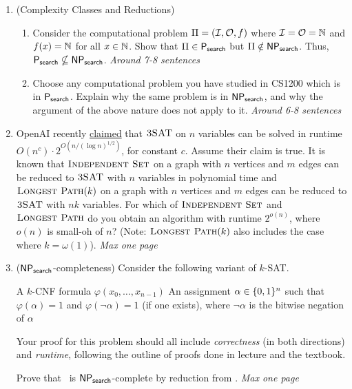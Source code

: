 \documentclass[11pt]{article}
\begin{document}
\begin{enumerate}
    \item (Complexity Classes and Reductions)
    \begin{enumerate}
        \item 
        Consider the computational problem $\Pi = (\mathcal{I},\mathcal{O},f)$ where $\mathcal{I}=\mathcal{O}=\mathbb{N}$ and $f(x)=\mathbb{N}$ for all $x\in \mathbb{N}$.  Show that $\Pi\in \mathsf{P_{search}}$ but $\Pi\notin \mathsf{NP_{search}}$.  Thus, $\mathsf{P_{search}}\nsubseteq\mathsf{NP_{search}}$. \textit{Around 7-8 sentences}

\item  Choose any computational problem you have studied in CS1200 which is in $\mathsf{P_{search}}$. Explain why the same problem is in $\mathsf{NP_{search}}$, and why the argument of the above nature does not apply to it. \textit{Around 6-8 sentences}

\end{enumerate}

\item OpenAI recently \href{https://openai.com/index/building-scientific-understanding-with-academic-communities/}{claimed} that $\text{\sc 3SAT}$ on $n$ variables can be solved in runtime $O(n^c) \cdot 2^{O(n/(\log n)^{1/2})}$, for constant $c$. Assume their claim is true. It is known that $\text{\sc Independent Set}$ on a graph with $n$ vertices and $m$ edges can be reduced to $\text{\sc 3SAT}$ with $n$ variables in polynomial time and $\text{\sc Longest Path}(k)$ on a graph with $n$ vertices and $m$ edges can be reduced to $\text{\sc 3SAT}$ with $nk$ variables. For which of $\text{\sc Independent Set}$ and $\text{\sc Longest Path}$ do you obtain an algorithm with runtime $2^{o(n)}$, where $o(n)$ is small-oh of $n$? (Note: $\text{\sc Longest Path}(k)$ also includes the case where $k=\omega(1)$). \textit{Max one page}

\item ($\mathsf{NP_{search}}$-completeness) Consider the following variant of $k$-SAT.

       \compprob{\FlipkSAT}
        {A $k$-CNF formula $\varphi(x_0,\ldots,x_{n-1})$}
        {An assignment $\alpha\in\{0,1\}^n$ such that $\varphi(\alpha)=1$ and $\varphi(\neg \alpha)=1$ (if one exists), where $\neg \alpha$ is the bitwise negation of $\alpha$}

        Your proof for this problem should all include \textit{correctness} (in both directions) and \textit{runtime}, following the outline of proofs done in lecture and the textbook.  

Prove that \FlipFourSAT\ is $\mathsf{NP_{search}}$-complete by reduction from \ThreeSAT.  \textit{Max one page}


\end{enumerate}
\end{document}
